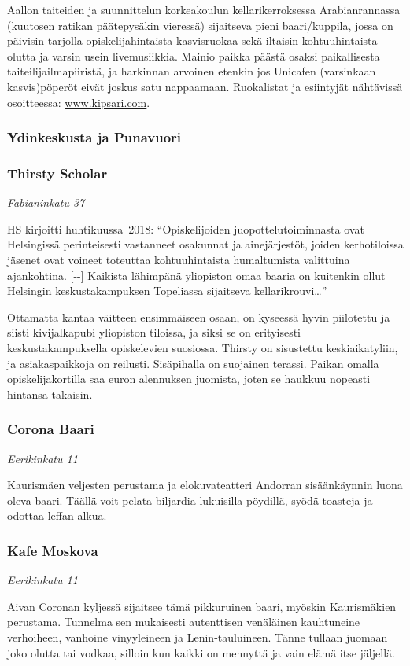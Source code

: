 \documentclass[../ala_hataile.tex]{subfiles}
\begin{document}
Aallon taiteiden ja suunnittelun korkeakoulun kellarikerroksessa
Arabianrannassa (kuutosen ratikan
päätepysäkin vieressä) sijaitseva pieni
baari/kuppila, jossa on päivisin tarjolla
opiskelijahintaista kasvisruokaa sekä iltaisin
kohtuuhintaista olutta ja varsin usein
livemusiikkia. Mainio paikka päästä osaksi
paikallisesta taiteilijailmapiiristä, ja harkinnan
arvoinen etenkin jos Unicafen (varsinkaan
kasvis)pöperöt eivät joskus satu
nappaamaan. Ruokalistat ja esiintyjät nähtävissä
osoitteessa: \url{www.kipsari.com}.
\subsubsection*{Ydinkeskusta ja Punavuori}
\subsubsection*{Thirsty Scholar}
\textit{Fabianinkatu 37}

HS kirjoitti huhtikuussa~2018: ``Opiskelijoiden juopottelu\-­toiminnasta ovat Helsingissä perinteisesti vastanneet osa\-kunnat ja aine\-järjestöt, joiden kerhotiloissa jäsenet ovat voineet toteuttaa kohtuu\-hintaista humaltumista valittuina ajan\-kohtina. [-{}-] Kaikista lähimpänä yli\-opiston omaa baaria on kuitenkin ollut Helsingin keskusta\-kampuksen Topeliassa sijaitseva kellari­krouvi\dots''

Ottamatta kantaa väitteen ensimmäiseen osaan, on kyseessä hyvin piilotettu ja siisti kivi\-jalka\-pubi yliopiston tiloissa, ja siksi se on erityisesti keskusta\-kampuksella opiskelevien suosiossa. Thirsty on sisustettu keski\-aika\-tyliin, ja asiakas\-paikkoja on reilusti. Sisäpihalla on suojainen terassi. Paikan omalla opiskelija\-kortilla saa euron alennuksen juomista, joten se haukkuu nopeasti hintansa takaisin.
\subsubsection*{Corona Baari}
\textit{Eerikinkatu 11}

Kaurismäen veljesten perustama ja elokuvateatteri
Andorran sisäänkäynnin luona
oleva baari. Täällä voit pelata biljardia lukuisilla
pöydillä, syödä toasteja ja odottaa
leffan alkua.
\subsubsection*{Kafe Moskova}
\textit{Eerikinkatu 11}

Aivan Coronan kyljessä sijaitsee tämä
pikkuruinen baari, myöskin Kaurismäkien
perustama. Tunnelma sen mukaisesti autenttisen
venäläinen kauhtuneine verhoiheen,
vanhoine vinyyleineen ja Lenin-tauluineen.
Tänne tullaan juomaan joko olutta
tai vodkaa, silloin kun kaikki on mennyttä
ja vain elämä itse jäljellä.
\end{document}
